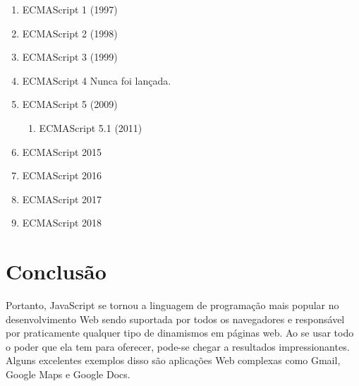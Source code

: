 \begin{enumerate}
  \item ECMAScript 1 (1997)	
  \item ECMAScript 2 (1998)	
  \item ECMAScript 3 (1999)	
  \item ECMAScript 4	Nunca foi lançada.
  \item ECMAScript 5 (2009)
    \begin{enumerate}[label*=\arabic*.]
    \item ECMAScript 5.1 (2011)
    \end{enumerate}
  \item ECMAScript 2015
  \item ECMAScript 2016
  \item ECMAScript 2017
  \item ECMAScript 2018
\end{enumerate}

\section{Conclusão}
Portanto, JavaScript se tornou a linguagem de programação mais popular no 
desenvolvimento Web sendo suportada por todos os navegadores e responsável por 
praticamente qualquer tipo de dinamismos em páginas web. Ao se usar todo o 
poder que ela tem para oferecer, pode-se chegar a resultados impressionantes. 
Alguns excelentes exemplos disso são aplicações Web complexas como Gmail, 
Google Maps e Google Docs. 
